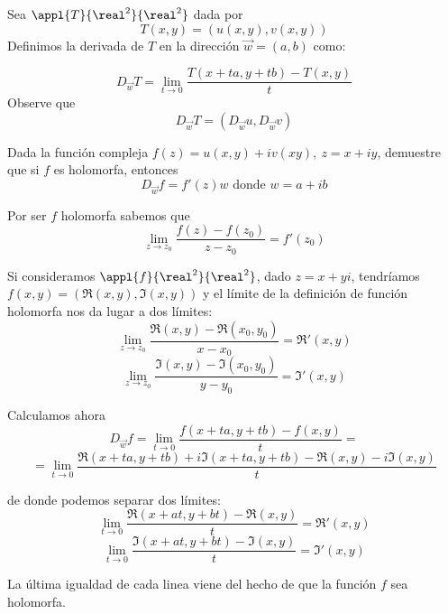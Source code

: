 \begin{problem}[9]
Sea $\appl{T}{\real^2}{\real^2}$ dada por
\[T(x,y) = \left(u(x,y), v(x,y)\right)\]
Definimos la derivada de $T$ en la dirección $\overrightarrow{w}=(a,b)$ como:

\[D_{\overrightarrow{w}} T = \lim_{t \to 0} \frac{T(x+ta, y+tb) - T(x,y)}{t}\]
Observe que
\[D_{\overrightarrow{w}} T = \left(D_{\overrightarrow{w}} u, D_{\overrightarrow{w}} v\right)\]

Dada la función compleja $f(z)=u(x,y)+iv(xy), \ z=x+iy$, demuestre que si $f$ es holomorfa, entonces
\[D_{\overrightarrow{w}} f = f'(z)w \text{ donde } w = a+ib\]

\solution
{}

Por ser $f$ holomorfa sabemos que
\[\lim_{z\to z_0} \frac{f(z)-f(z_0)}{z-z_0}= f'(z_0)\]

Si consideramos $\appl{f}{\real^2}{\real^2}$, dado $z=x+yi$, tendríamos $f(x,y)=\left(\Re(x,y), \Im(x,y)\right)$ y el límite de la definición de función holomorfa nos da lugar a dos límites:
\[\lim_{z \to z_0} \frac{\Re(x,y)-\Re(x_0,y_0)}{x-x_0}=\Re'(x,y)\]
\[\lim_{z \to z_0} \frac{\Im(x,y)-\Im(x_0,y_0)}{y-y_0}=\Im'(x,y)\]

Calculamos ahora
\[D_{\overrightarrow{w}} f = \lim_{t \to 0} \frac{f(x+ta, y+tb) - f(x,y)}{t} =\]
\[= \lim_{t \to 0} \frac{\Re(x+ta, y+tb)+i\Im(x+ta,y+tb)-\Re(x,y)-i\Im(x,y)}{t} \]

de donde podemos separar dos límites:
\[\lim_{t \to 0} \frac{\Re(x+at,y+bt) - \Re(x,y)}{t} = \Re'(x,y)\]
\[\lim_{t \to 0} \frac{\Im(x+at,y+bt) - \Im(x,y)}{t} = \Im'(x,y)\]

La última igualdad de cada linea viene del hecho de que la función $f$ sea holomorfa.

\end{problem}

